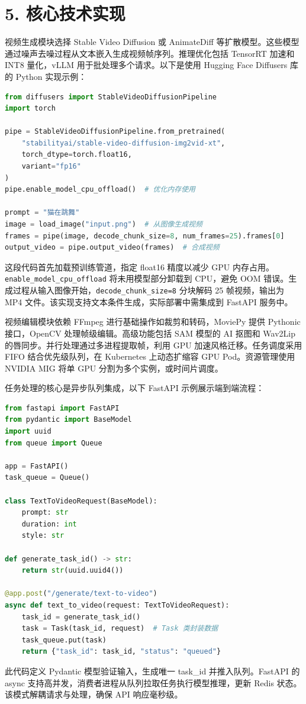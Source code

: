 \chapter{5. 核心技术实现}
视频生成模块选择 Stable Video Diffusion 或 AnimateDiff 等扩散模型。这些模型通过噪声去噪过程从文本嵌入生成视频帧序列。推理优化包括 TensorRT 加速和 INT8 量化，vLLM 用于批处理多个请求。以下是使用 Hugging Face Diffusers 库的 Python 实现示例：\par
\begin{lstlisting}[language=python]
from diffusers import StableVideoDiffusionPipeline
import torch

pipe = StableVideoDiffusionPipeline.from_pretrained(
    "stabilityai/stable-video-diffusion-img2vid-xt",
    torch_dtype=torch.float16,
    variant="fp16"
)
pipe.enable_model_cpu_offload()  # 优化内存使用

prompt = "猫在跳舞"
image = load_image("input.png")  # 从图像生成视频
frames = pipe(image, decode_chunk_size=8, num_frames=25).frames[0]
output_video = pipe.output_video(frames)  # 合成视频
\end{lstlisting}
这段代码首先加载预训练管道，指定 float16 精度以减少 GPU 内存占用。\texttt{enable\_{}model\_{}cpu\_{}offload} 将未用模型部分卸载到 CPU，避免 OOM 错误。生成过程从输入图像开始，\texttt{decode\_{}chunk\_{}size=8} 分块解码 25 帧视频，输出为 MP4 文件。该实现支持文本条件生成，实际部署中需集成到 FastAPI 服务中。\par
视频编辑模块依赖 FFmpeg 进行基础操作如裁剪和转码，MoviePy 提供 Pythonic 接口，OpenCV 处理帧级编辑。高级功能包括 SAM 模型的 AI 抠图和 Wav2Lip 的唇同步。并行处理通过多进程提取帧，利用 GPU 加速风格迁移。任务调度采用 FIFO 结合优先级队列，在 Kubernetes 上动态扩缩容 GPU Pod。资源管理使用 NVIDIA MIG 将单 GPU 分割为多个实例，或时间片调度。\par
任务处理的核心是异步队列集成，以下 FastAPI 示例展示端到端流程：\par
\begin{lstlisting}[language=python]
from fastapi import FastAPI
from pydantic import BaseModel
import uuid
from queue import Queue

app = FastAPI()
task_queue = Queue()

class TextToVideoRequest(BaseModel):
    prompt: str
    duration: int
    style: str

def generate_task_id() -> str:
    return str(uuid.uuid4())

@app.post("/generate/text-to-video")
async def text_to_video(request: TextToVideoRequest):
    task_id = generate_task_id()
    task = Task(task_id, request)  # Task 类封装数据
    task_queue.put(task)
    return {"task_id": task_id, "status": "queued"}
\end{lstlisting}
此代码定义 Pydantic 模型验证输入，生成唯一 task\_{}id 并推入队列。FastAPI 的 async 支持高并发，消费者进程从队列拉取任务执行模型推理，更新 Redis 状态。该模式解耦请求与处理，确保 API 响应毫秒级。\par
